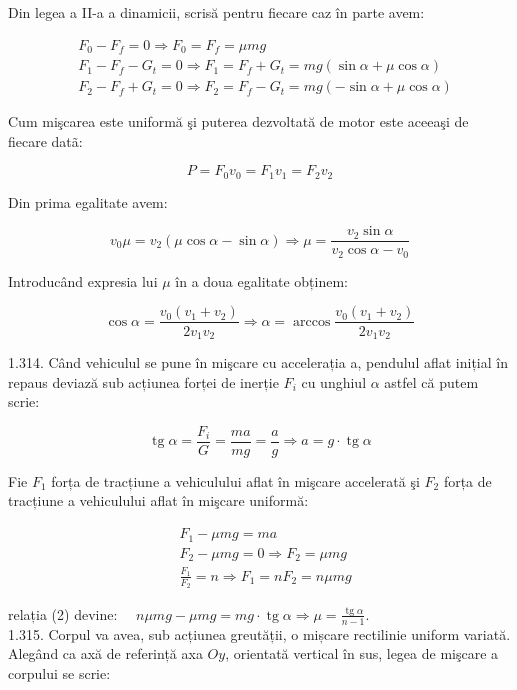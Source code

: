 Din legea a II-a a dinamicii, scrisă pentru fiecare caz în parte avem:

$$
\begin{aligned}
& F_{0}-F_{f}=0 \Rightarrow F_{0}=F_{f}=\mu m g \\
& F_{1}-F_{f}-G_{t}=0 \Rightarrow F_{1}=F_{f}+G_{t}=m g(\sin \alpha+\mu \cos \alpha) \\
& F_{2}-F_{f}+G_{t}=0 \Rightarrow F_{2}=F_{f}-G_{t}=m g(-\sin \alpha+\mu \cos \alpha)
\end{aligned}
$$

Cum mişcarea este uniformă şi puterea dezvoltată de motor este aceeaşi de fiecare datã:

$$
P=F_{0} v_{0}=F_{1} v_{1}=F_{2} v_{2}
$$

Din prima egalitate avem:

$$
v_{0} \mu=v_{2}(\mu \cos \alpha-\sin \alpha) \Rightarrow \mu=\frac{v_{2} \sin \alpha}{v_{2} \cos \alpha-v_{0}}
$$

Introducând expresia lui $\mu$ în a doua egalitate obținem:

$$
\cos \alpha=\frac{v_{0}\left(v_{1}+v_{2}\right)}{2 v_{1} v_{2}} \Rightarrow \alpha=\arccos \frac{v_{0}\left(v_{1}+v_{2}\right)}{2 v_{1} v_{2}}
$$

1.314. Când vehiculul se pune în mişcare cu accelerația a, pendulul aflat inițial în repaus deviază sub acțiunea forței de inerție $F_{i}$ cu unghiul $\alpha$ astfel că putem scrie:


\begin{equation*}
\operatorname{tg} \alpha=\frac{F_{i}}{G}=\frac{m a}{m g}=\frac{a}{g} \Rightarrow a=g \cdot \operatorname{tg} \alpha \tag{1}
\end{equation*}


Fie $F_{1}$ forța de tracțiune a vehiculului aflat în mişcare accelerată şi $F_{2}$ forța de tracțiune a vehiculului aflat în mişcare uniformă:


\begin{align*}
& F_{1}-\mu m g=m a  \tag{2}\\
& F_{2}-\mu m g=0 \Rightarrow F_{2}=\mu m g \\
& \frac{F_{1}}{F_{2}}=n \Rightarrow F_{1}=n F_{2}=n \mu m g
\end{align*}


relația (2) devine: $\quad n \mu m g-\mu m g=m g \cdot \operatorname{tg} \alpha \Rightarrow \mu=\frac{\operatorname{tg} \alpha}{n-1}$.\\
1.315. Corpul va avea, sub acțiunea greutății, o mișcare rectilinie uniform variată. Alegând ca axă de referință axa $O y$, orientată vertical în sus, legea de mişcare a corpului se scrie:

